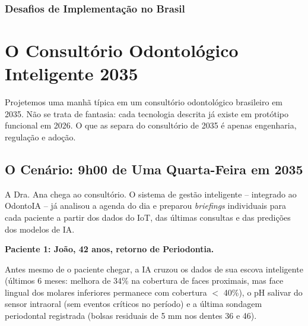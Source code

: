 \subsubsection{Desafios de Implementação no Brasil}


\section{O Consultório Odontológico Inteligente 2035}
\label{sec:consultorio-2035}

\nivelquatro

Projetemos uma manhã típica em um consultório odontológico brasileiro em 2035.
Não se trata de fantasia: cada tecnologia descrita já existe em protótipo
funcional em 2026. O que as separa do consultório de 2035 é apenas engenharia,
regulação e adoção.


\subsection{O Cenário: 9h00 de Uma Quarta-Feira em 2035}

A Dra. Ana chega ao consultório. O sistema de gestão inteligente -- integrado
ao OdontoIA -- já analisou a agenda do dia e preparou \textit{briefings}
individuais para cada paciente a partir dos dados do IoT, das últimas consultas
e das predições dos modelos de IA.

\textbf{Paciente 1: João, 42 anos, retorno de Periodontia.}

Antes mesmo de o paciente chegar, a IA cruzou os dados de sua escova inteligente
(últimos 6 meses: melhora de 34\% na cobertura de faces proximais, mas face
lingual dos molares inferiores permanece com cobertura $<$ 40\%), o pH salivar
do sensor intraoral (sem eventos críticos no período) e a última sondagem
periodontal registrada (bolsas residuais de 5 mm nos dentes 36 e 46).

